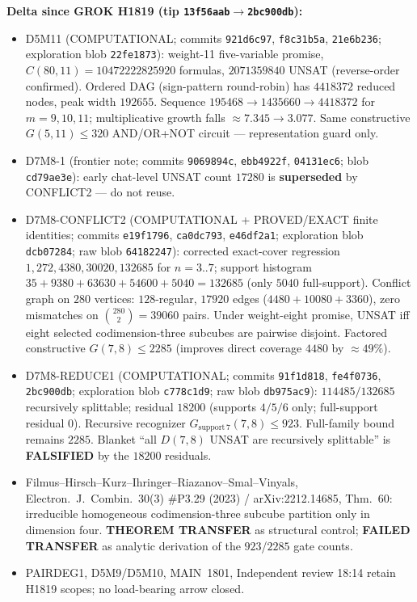 \documentclass[11pt]{article}
\begin{document}
\textbf{Delta since GROK H1819 (tip \texttt{13f56aab}$\to$\texttt{2bc900db}):}
\begin{itemize}
\item D5M11 (COMPUTATIONAL; commits \texttt{921d6c97}, \texttt{f8c31b5a},
\texttt{21e6b236}; exploration blob \texttt{22fe1873}): weight-11 five-variable
promise, $C(80,11)=10472222825920$ formulas, $2071359840$ UNSAT (reverse-order
confirmed). Ordered DAG (sign-pattern round-robin) has $4418372$ reduced nodes,
peak width $192655$. Sequence $195468\to1435660\to4418372$ for $m=9,10,11$;
multiplicative growth falls $\approx 7.345\to 3.077$. Same constructive
$G(5,11)\le 320$ AND/OR+NOT circuit --- representation guard only.
\item D7M8-1 (frontier note; commits \texttt{9069894c}, \texttt{ebb4922f},
\texttt{04131ec6}; blob \texttt{cd79ae3e}): early chat-level UNSAT count $17280$
is \textbf{superseded} by CONFLICT2 --- do not reuse.
\item D7M8-CONFLICT2 (COMPUTATIONAL + PROVED/EXACT finite identities; commits
\texttt{e19f1796}, \texttt{ca0dc793}, \texttt{e46df2a1}; exploration blob
\texttt{dcb07284}; raw blob \texttt{64182247}): corrected exact-cover regression
$1,272,4380,30020,132685$ for $n=3..7$; support histogram
$35+9380+63630+54600+5040=132685$ (only $5040$ full-support). Conflict graph on
$280$ vertices: $128$-regular, $17920$ edges ($4480+10080+3360$), zero mismatches
on $\binom{280}{2}=39060$ pairs. Under weight-eight promise, UNSAT iff eight
selected codimension-three subcubes are pairwise disjoint. Factored constructive
$G(7,8)\le 2285$ (improves direct coverage $4480$ by $\approx 49\%$).
\item D7M8-REDUCE1 (COMPUTATIONAL; commits \texttt{91f1d818}, \texttt{fe4f0736},
\texttt{2bc900db}; exploration blob \texttt{c778c1d9}; raw blob \texttt{db975ac9}):
$114485/132685$ recursively splittable; residual $18200$ (supports $4/5/6$ only;
full-support residual $0$). Recursive recognizer $G_{\mathrm{support}\,7}(7,8)\le 923$.
Full-family bound remains $2285$. Blanket ``all $D(7,8)$ UNSAT are recursively
splittable'' is \textbf{FALSIFIED} by the $18200$ residuals.
\item Filmus--Hirsch--Kurz--Ihringer--Riazanov--Smal--Vinyals, Electron.\ J.\
Combin.\ 30(3) \#P3.29 (2023) / arXiv:2212.14685, Thm.~60: irreducible homogeneous
codimension-three subcube partition only in dimension four.
\textbf{THEOREM TRANSFER} as structural control; \textbf{FAILED TRANSFER} as
analytic derivation of the $923$/$2285$ gate counts.
\item PAIRDEG1, D5M9/D5M10, MAIN~1801, Independent review 18:14 retain H1819
scopes; no load-bearing arrow closed.
\end{itemize}
\end{document}
